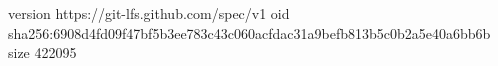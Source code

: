 version https://git-lfs.github.com/spec/v1
oid sha256:6908d4fd09f47bf5b3ee783c43c060acfdac31a9befb813b5c0b2a5e40a6bb6b
size 422095
